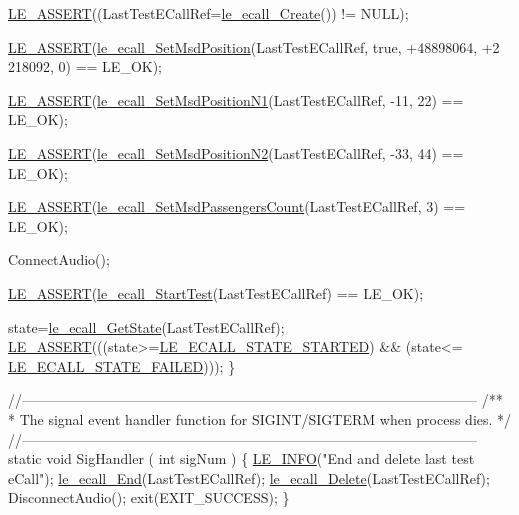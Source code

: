 \begin{DoxyCodeInclude}
{{{{{    \hyperlink{le__log_8h_ac0dbbef91dc0fed449d0092ff0557b39}{LE\_ASSERT}((LastTestECallRef=\hyperlink{le__ecall__interface_8h_aad7fa3b34d9d72a2f1d4baa681ba25cc}{le\_ecall\_Create}()) != NULL);

    \hyperlink{le__log_8h_ac0dbbef91dc0fed449d0092ff0557b39}{LE\_ASSERT}(\hyperlink{le__ecall__interface_8h_a2b56b7b7fd7f936c144d30eba7815908}{le\_ecall\_SetMsdPosition}(LastTestECallRef, \textcolor{keyword}{true}, +48898064, +2
      218092, 0) == LE\_OK);

    \hyperlink{le__log_8h_ac0dbbef91dc0fed449d0092ff0557b39}{LE\_ASSERT}(\hyperlink{le__ecall__interface_8h_af3cfea09eea1b1ba39648798070ad139}{le\_ecall\_SetMsdPositionN1}(LastTestECallRef, -11, 22) == 
      LE\_OK);

    \hyperlink{le__log_8h_ac0dbbef91dc0fed449d0092ff0557b39}{LE\_ASSERT}(\hyperlink{le__ecall__interface_8h_a6b25b9b242ba114f31ae2f853070bf11}{le\_ecall\_SetMsdPositionN2}(LastTestECallRef, -33, 44) == 
      LE\_OK);

    \hyperlink{le__log_8h_ac0dbbef91dc0fed449d0092ff0557b39}{LE\_ASSERT}(\hyperlink{le__ecall__interface_8h_a8c009bb03d61dcd0ffbd9e986b692a85}{le\_ecall\_SetMsdPassengersCount}(LastTestECallRef, 3) ==
       LE\_OK);

    ConnectAudio();

    \hyperlink{le__log_8h_ac0dbbef91dc0fed449d0092ff0557b39}{LE\_ASSERT}(\hyperlink{le__ecall__interface_8h_aa5d23a1bea370b1ae29fc52d7a89d947}{le\_ecall\_StartTest}(LastTestECallRef) == LE\_OK);

    state=\hyperlink{le__ecall__interface_8h_a7881e794b9249222edde10f76d7663c9}{le\_ecall\_GetState}(LastTestECallRef);
    \hyperlink{le__log_8h_ac0dbbef91dc0fed449d0092ff0557b39}{LE\_ASSERT}(((state>=\hyperlink{le__ecall__interface_8h_a233609e4724e549a1405f9177c0a07dda94ba7aacca9dfe74c4733515a7ba2c5e}{LE\_ECALL\_STATE\_STARTED}) && (state<=
      \hyperlink{le__ecall__interface_8h_a233609e4724e549a1405f9177c0a07dda5275385371c51e441a9eb97626c271b4}{LE\_ECALL\_STATE\_FAILED})));
\}

\textcolor{comment}{//--------------------------------------------------------------------------------------------------}\textcolor{comment}{}
\textcolor{comment}{/**}
\textcolor{comment}{ * The signal event handler function for SIGINT/SIGTERM when process dies.}
\textcolor{comment}{ */}
\textcolor{comment}{//--------------------------------------------------------------------------------------------------}
\textcolor{keyword}{static} \textcolor{keywordtype}{void} SigHandler
(
    \textcolor{keywordtype}{int} sigNum
)
\{
    \hyperlink{le__log_8h_a23e6d206faa64f612045d688cdde5808}{LE\_INFO}(\textcolor{stringliteral}{"End and delete last test eCall"});
    \hyperlink{le__ecall__interface_8h_a85800c86f9709fb7baa7219cc762181c}{le\_ecall\_End}(LastTestECallRef);
    \hyperlink{le__ecall__interface_8h_af1221deb68c46912748f65505b3e4919}{le\_ecall\_Delete}(LastTestECallRef);
    DisconnectAudio();
    exit(EXIT\_SUCCESS);
\}

}}}}}
\end{DoxyCodeInclude}
